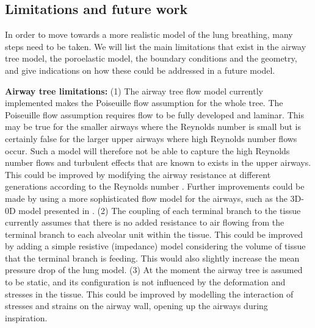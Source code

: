 


%
\subsection{Limitations and future work}
\label{sec:future_work}
%
In order to move towards a more realistic model of the lung breathing, many steps need to be taken. We will list the main limitations that exist in the airway tree model, the poroelastic model, the boundary conditions and the geometry, and give indications on how these could be addressed in a future model.

\noindent \textbf{Airway tree limitations:} (1) The airway tree flow model currently implemented makes the Poiseuille flow assumption for the whole tree. The Poiseuille flow assumption requires flow to be fully developed and laminar. This may  be true for the smaller airways where the Reynolds number is small but is certainly false for the larger upper airways where high Reynolds number flows occur. Such a model will therefore not be able to capture the high Reynolds number flows and turbulent effects that are known to exists in the upper airways.
This could be improved by modifying the airway resistance at different generations according to the Reynolds number \cite{Swan2012,pedley1970energy}. Further improvements could be made by using a more sophisticated flow model for the airways, such as the 3D-0D model presented in \cite{ismail2013coupled}. (2) The coupling of each terminal branch to the tissue currently assumes that there is no added resistance to air flowing from the terminal branch to each alveolar unit within the tissue. This could be improved by adding a simple resistive (impedance) model considering the volume of tissue that the terminal branch is feeding. This would also slightly increase the mean pressure drop of the lung model. (3) At the moment the airway tree is assumed to be static, and its configuration is not influenced by the deformation and stresses in the tissue. This could be improved by modelling the interaction of stresses and strains on the airway wall, opening up the airways during inspiration.



